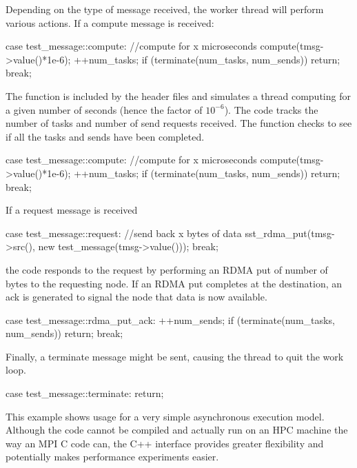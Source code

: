 Depending on the type of message received, the worker thread will perform various actions. 
If a compute message is received:

\begin{CppCode}
            case test_message::compute:
                //compute for x microseconds
                compute(tmsg->value()*1e-6);
                ++num_tasks;
                if (terminate(num_tasks, num_sends))
                    return;
                break;
\end{CppCode}
The function  is included by the header files and simulates a thread computing for a given number of seconds (hence the factor of $10^{-6}$).  
The code tracks the number of tasks and number of send requests received.
The function  checks to see if all the tasks and sends have been completed.

\begin{CppCode}
            case test_message::compute:
                //compute for x microseconds
                compute(tmsg->value()*1e-6);
                ++num_tasks;
                if (terminate(num_tasks, num_sends))
                    return;
                break;
\end{CppCode}
If a request message is received

\begin{CppCode}
            case test_message::request:
                //send back x bytes of data
                sst_rdma_put(tmsg->src(), new test_message(tmsg->value()));
                break;
\end{CppCode}
the code responds to the request by performing an RDMA put of  number of bytes to the requesting node. If an RDMA put completes at the destination, an ack is generated to signal the node that data is now available.

\begin{CppCode}
            case test_message::rdma_put_ack:
                ++num_sends;
                if (terminate(num_tasks, num_sends))
                    return;
                break;
\end{CppCode}
Finally, a terminate message might be sent, causing the thread to quit the work loop.

\begin{CppCode}
            case test_message::terminate:
                return;
\end{CppCode}

This example shows usage for a very simple asynchronous execution model.  
Although the code cannot be compiled and actually run on an HPC machine the way an MPI C code can,
the C++ interface provides greater flexibility and potentially makes performance experiments easier.
